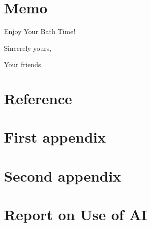 \documentclass{mcmthesis}
\begin{document}
\section*{Memo} %

\begin{letter}{Enjoy Your Bath Time!}


\vspace{\parskip}

Sincerely yours,

Your friends

\end{letter}










\newpage
\section*{Reference} %
\printbibliography




\begin{appendices}
\section{First appendix}
\section{Second appendix}
\end{appendices}




\newpage
{}
\setcounter{lastpage}{\value{page}}
\thispagestyle{empty} 

\section*{Report on Use of AI}
\end{document}
